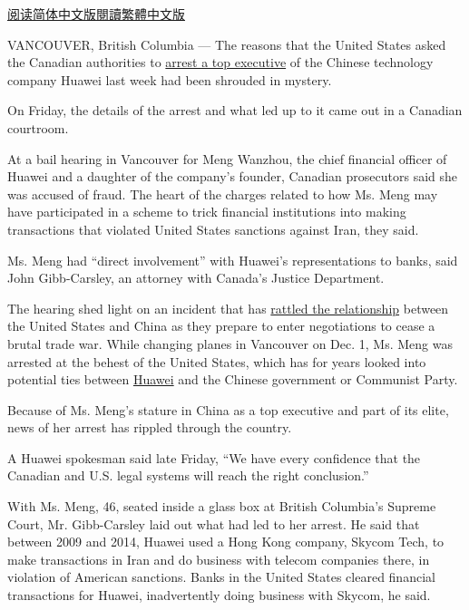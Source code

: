\href{https://cn.nytimes.com/technology/20181210/huawei-meng-wanzhou-fraud/}{阅读简体中文版}\href{https://cn.nytimes.com/technology/20181210/huawei-meng-wanzhou-fraud/zh-hant/}{閱讀繁體中文版}

VANCOUVER, British Columbia --- The reasons that the United States asked
the Canadian authorities to
\href{https://www.nytimes.com/2018/12/05/business/huawei-cfo-arrest-canada-extradition.html?module=inline}{arrest
a top executive} of the Chinese technology company Huawei last week had
been shrouded in mystery.

On Friday, the details of the arrest and what led up to it came out in a
Canadian courtroom.

At a bail hearing in Vancouver for Meng Wanzhou, the chief financial
officer of Huawei and a daughter of the company's founder, Canadian
prosecutors said she was accused of fraud. The heart of the charges
related to how Ms. Meng may have participated in a scheme to trick
financial institutions into making transactions that violated United
States sanctions against Iran, they said.

Ms. Meng had ``direct involvement'' with Huawei's representations to
banks, said John Gibb-Carsley, an attorney with Canada's Justice
Department.

The hearing shed light on an incident that has
\href{https://www.nytimes.com/2018/12/07/world/asia/huawei-arrest-china.html?action=click\&module=Top\%20Stories\&pgtype=Homepage}{rattled
the relationship} between the United States and China as they prepare to
enter negotiations to cease a brutal trade war. While changing planes in
Vancouver on Dec. 1, Ms. Meng was arrested at the behest of the United
States, which has for years looked into potential ties between
\href{https://www.nytimes.com/2018/12/06/technology/huawei-arrest-meng-wanzhou.html}{Huawei}
and the Chinese government or Communist Party.

Because of Ms. Meng's stature in China as a top executive and part of
its elite, news of her arrest has rippled through the country.

A Huawei spokesman said late Friday, ``We have every confidence that the
Canadian and U.S. legal systems will reach the right conclusion.''

With Ms. Meng, 46, seated inside a glass box at British Columbia's
Supreme Court, Mr. Gibb-Carsley laid out what had led to her arrest. He
said that between 2009 and 2014, Huawei used a Hong Kong company, Skycom
Tech, to make transactions in Iran and do business with telecom
companies there, in violation of American sanctions. Banks in the United
States cleared financial transactions for Huawei, inadvertently doing
business with Skycom, he said.

